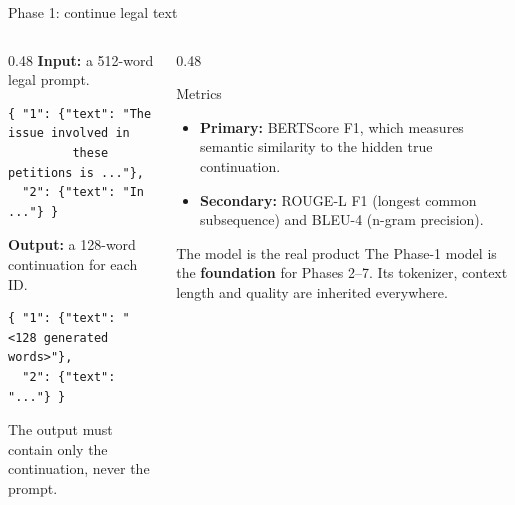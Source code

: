 \documentclass[aspectratio=169,11pt]{beamer}
\begin{document}
\begin{frame}[fragile]{Phase 1: continue legal text}
  \begin{columns}[T]
    \begin{column}{0.48\textwidth}
      \textbf{Input:} a 512-word legal prompt.
      \scriptsize
\begin{verbatim}
{ "1": {"text": "The issue involved in
         these petitions is ..."},
  "2": {"text": "In ..."} }
\end{verbatim}
      \normalsize\textbf{Output:} a 128-word continuation for each ID.\scriptsize
\begin{verbatim}
{ "1": {"text": "<128 generated words>"},
  "2": {"text": "..."} }
\end{verbatim}
      \small The output must contain \alert{only the continuation}, never the prompt.
    \end{column}
    \begin{column}{0.48\textwidth}
      \begin{block}{Metrics}
        \small
        \begin{itemize}
          \item \textbf{Primary:} BERTScore F1, which measures semantic similarity to the hidden true continuation.
          \item \textbf{Secondary:} ROUGE-L F1 (longest common subsequence) and BLEU-4 (n-gram precision).
        \end{itemize}
      \end{block}
      \begin{exampleblock}{The model is the real product}
        \small
        The Phase-1 model is the \textbf{foundation} for Phases 2--7.
        Its tokenizer, context length and quality are inherited everywhere.
      \end{exampleblock}
    \end{column}
  \end{columns}
\end{frame}
\end{document}
